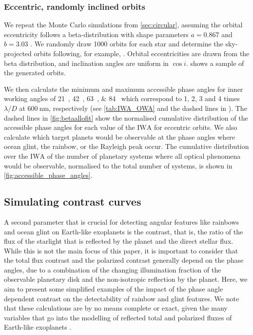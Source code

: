 \documentclass[usenatbib]{mnras}
\newcommand{\IWA}{\ensuremath{\mathrm{IWA}}\xspace}
\begin{document}
\subsubsection{Eccentric, randomly inclined orbits}
\label{sec:eccentric}

We repeat the Monte Carlo simulations from \cref{sec:circular}, assuming the orbital eccentricity follows a beta-distribution with shape parameters $a=0.867$ and $b=3.03$ \citep{2013MNRAS.434L..51K}. 
We randomly draw \num{1000} orbits for each star and determine the sky-projected orbits following, for example, \citet{2010exop.book...15M}. 
Orbital eccentricities are drawn from the beta distribution, and inclination angles are uniform in $\cos i$. 
 shows a sample of the generated orbits.

We then calculate the minimum and maximum accessible phase angles for inner working angles of \qtylist{21; 42; 63; 84}{\mas} which correspond to 1, 2, 3 and 4 times $\lambda / D$ at $\qty{600}{\nano\meter}$, respectively (see \cref{tab:IWA_OWA} and the dashed lines in ).
The dashed lines in \cref{fig:betaallofit} show the normalised cumulative distribution of the accessible phase angles for each value of the \IWA for eccentric orbits. 
We also calculate which target planets would be observable at the phase angles where ocean glint, the rainbow, or the Rayleigh peak occur.
The cumulative distribution over the \IWA of the number of planetary systems where all optical phenomena would be observable, normalised to the total number of systems, is shown in \cref{fig:accessible_phase_angles}.



\subsection{Simulating contrast curves}
\label{subsec:2.4}

A second parameter that is crucial for detecting angular features like rainbows and ocean glint on Earth-like exoplanets is the contrast, that is, the ratio of the flux of the starlight that is reflected by the planet and the direct stellar flux. 
While this is not the main focus of this paper, it is important to consider that the total flux contrast and the polarized contrast generally depend on the phase angles, due to a combination of the changing illumination fraction of the observable planetary disk and the non-isotropic reflection by the planet.
Here, we aim to present some simplified examples of the impact of the phase angle dependent contrast on the detectability of rainbow and glint features. 
We note that these calculations are by no means complete or exact, given the many variables that go into the modelling of reflected total and polarized fluxes of Earth-like exoplanets \citep{treesandstam2019,trees2022}.
\end{document}
